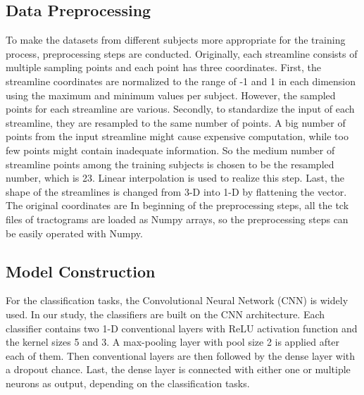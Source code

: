 \subsection{Data Preprocessing}
To make the datasets from different subjects more appropriate for the training process, preprocessing steps are conducted.
Originally, each streamline consists of multiple sampling points and each point has three coordinates. 
First, the streamline coordinates are normalized to the range of -1 and 1 in each dimension using the maximum and minimum values per subject.
However, the sampled points for each streamline are various. Secondly, to standardize the input of each streamline, they are resampled to the same 
number of points. A big number of points from the input streamline might cause expensive computation, while too few points might contain 
inadequate information. So the medium number of streamline points among the training subjects is chosen to be the resampled number, which is 23.
Linear interpolation is used to realize this step. Last, the shape of the streamlines is changed from 3-D into 1-D by flattening the vector. 
The original coordinates are 
In beginning of the preprocessing steps, all the tck files of tractograms are loaded as Numpy arrays, 
so the preprocessing steps can be easily operated with Numpy. 

\subsection{Model Construction}

For the classification tasks, the Convolutional Neural Network (CNN) is widely used. In our study, the classifiers are built on the CNN architecture.
Each classifier contains two 1-D conventional layers with ReLU activation function and the kernel sizes 5 and 3. 
A max-pooling layer with pool size 2 is applied after each of them. Then conventional layers are then followed by the dense layer with a dropout chance.
Last, the dense layer is connected with either one or multiple neurons as output, depending on the classification tasks.

